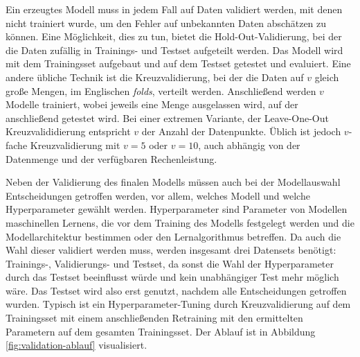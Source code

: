 	Ein erzeugtes Modell muss in jedem Fall auf Daten validiert werden, mit denen nicht trainiert wurde, um den Fehler auf unbekannten Daten abschätzen zu können. Eine Möglichkeit, dies zu tun, bietet die Hold-Out-Validierung, bei der die Daten zufällig in Trainings- und Testset aufgeteilt werden. Das Modell wird mit dem Trainingsset aufgebaut und auf dem Testset getestet und evaluiert. Eine andere übliche Technik ist die Kreuzvalidierung, bei der die Daten auf $v $ gleich große Mengen, im Englischen \textit{folds}, verteilt werden. Anschließend werden $v$ Modelle trainiert, wobei jeweils eine Menge ausgelassen wird, auf der anschließend getestet wird. %
	Bei einer extremen Variante, der Leave-One-Out Kreuzvalididierung entspricht $v$ der Anzahl der Datenpunkte. Üblich ist jedoch $v$-fache Kreuzvalidierung mit $v=5$ oder $v=10$, auch abhängig von der Datenmenge und der verfügbaren Rechenleistung.
	
	Neben der Validierung des finalen Modells müssen auch bei der Modellauswahl Entscheidungen getroffen werden, vor allem, welches Modell und welche Hyperparameter gewählt werden. Hyperparameter sind Parameter von Modellen maschinellen Lernens, die vor dem Training des Modells festgelegt werden und die Modellarchitektur bestimmen oder den Lernalgorithmus betreffen. Da auch die Wahl dieser validiert werden muss, werden insgesamt drei Datensets benötigt: Trainings-, Validierungs- und Testset, da sonst die Wahl der Hyperparameter durch das Testset beeinflusst würde und kein unabhängiger Test mehr möglich wäre. Das Testset wird also erst genutzt, nachdem alle Entscheidungen getroffen wurden. Typisch ist ein Hyperparameter-Tuning durch Kreuzvalidierung auf dem Trainingsset mit einem anschließenden Retraining mit den ermittelten Parametern auf dem gesamten Trainingsset. Der Ablauf ist in Abbildung \ref{fig:validation-ablauf} visualisiert.
	
